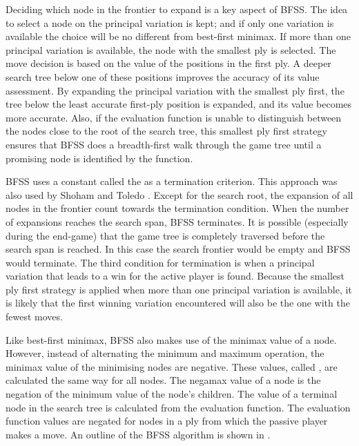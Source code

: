 Deciding which node in the frontier to expand is a key aspect of BFSS.  The idea to select a node on the principal variation is kept; and if only one variation is available the choice will be no different from best-first minimax.  If more than one principal variation is available, the node with the smallest ply is selected.  The move decision is based on the value of the positions in the first ply.  A deeper search tree below one of these positions improves the accuracy of its value assessment.  By expanding the principal variation with the smallest ply first, the tree below the least accurate first-ply position is expanded, and its value becomes more accurate. Also, if the evaluation function is unable to distinguish between the nodes close to the root of the search tree, this smallest ply first strategy ensures that BFSS does a breadth-first walk through the game tree until a promising node is identified by the function. 

BFSS uses a constant called the  as a termination criterion. This approach was also used by Shoham and Toledo \cite{shoham:randomized}.  Except for the search root, the expansion of all nodes in the frontier count towards the termination condition.  When the number of expansions reaches the search span, BFSS terminates.  It is possible (especially during the end-game) that the game tree is completely traversed before the search span is reached.  In this case the search frontier would be empty and BFSS would terminate.  The third condition for termination is when a principal variation that leads to a win for the active player is found.  Because the smallest ply first strategy is applied when more than one principal variation is available, it is likely that the first winning variation encountered will also be the one with the fewest moves.

Like best-first minimax, BFSS also makes use of the minimax value of a node.  However, instead of alternating the minimum and maximum operation, the minimax value of the minimising nodes are negative.  These values, called  \cite{furnkranz:survey}, are calculated the same way for all nodes.  The negamax value of a node is the negation of the minimum value of the node's children.  The value of a terminal node in the search tree is calculated from the evaluation function.   The evaluation function values are negated for nodes in a ply from which the passive player makes a move.  An outline of the BFSS algorithm is shown in .

